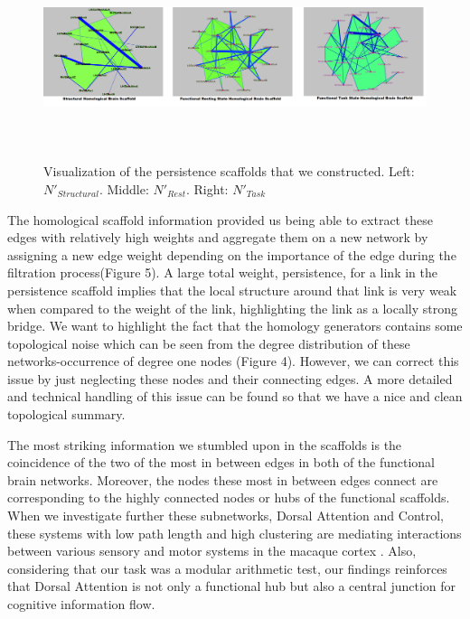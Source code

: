 \documentclass[9pt,twocolumn,twoside,lineno]{pnas-new}
\begin{document}
\begin{figure}%
\centering
\includegraphics[width=18cm,height=6cm]{strucscaf.png}
\caption{Visualization of the persistence scaffolds that we constructed. Left: $N'_{Structural}$. Middle: $N'_{Rest}$. Right: $N'_{Task}$  }
\end{figure}


The homological scaffold information provided us being able to extract these edges with relatively high weights and aggregate them on a new network by assigning a new edge weight depending on the importance of the edge during the filtration process(Figure 5). A large total weight, persistence, for a link in the persistence scaffold implies that the local structure around that link is very weak when compared to the weight of the link, highlighting the link as a locally strong bridge. 
We want to highlight the fact that the homology generators contains some topological noise which can be seen from the degree distribution of these networks-occurrence of degree one nodes (Figure 4). However, we can correct this issue by just neglecting these nodes and their connecting edges. A more detailed and technical handling of this issue can be found \cite{optimalc1,optimalc2} so that we have a nice and clean topological summary. 

The most striking information we stumbled upon in the scaffolds is the coincidence of the two of the most in between edges in both of the functional brain networks. Moreover, the nodes these most in between edges connect are corresponding to the highly connected nodes or hubs of the functional scaffolds. When we investigate further these subnetworks, Dorsal Attention and Control, these systems with low path length and high clustering are mediating interactions between various sensory and motor systems in the macaque cortex \cite{smallworld1,smallworld3}. Also, considering that our task was a modular arithmetic test, our findings reinforces that Dorsal Attention is not only a functional hub but also a central junction for cognitive information flow.
\end{document}
